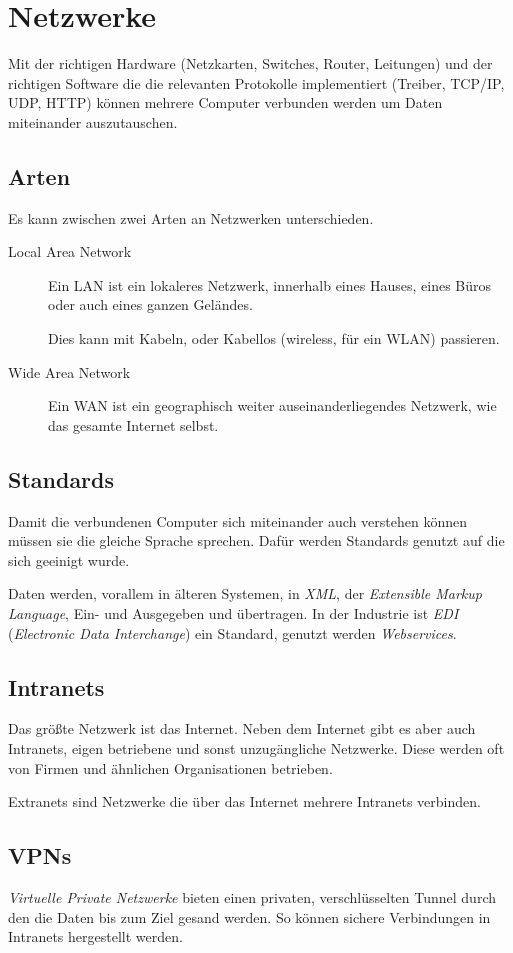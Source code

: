 \documentclass{article}
\begin{document}
\section{Netzwerke}
Mit der richtigen Hardware (Netzkarten, Switches, Router, Leitungen) und der richtigen Software die die relevanten Protokolle implementiert (Treiber, TCP/IP, UDP, HTTP) können mehrere Computer verbunden werden um Daten miteinander auszutauschen.

\subsection{Arten}
Es kann zwischen zwei Arten an Netzwerken unterschieden.
\begin{description}
 \item[Local Area Network] Ein LAN ist ein lokaleres Netzwerk, innerhalb eines Hauses, eines Büros oder auch eines ganzen Geländes.

Dies kann mit Kabeln, oder Kabellos (wireless, für ein WLAN) passieren.
 \item[Wide Area Network] Ein WAN ist ein geographisch weiter auseinanderliegendes Netzwerk, wie das gesamte Internet selbst.
\end{description}

\subsection{Standards}
Damit die verbundenen Computer sich miteinander auch verstehen können müssen sie die gleiche Sprache sprechen. Dafür werden Standards genutzt auf die sich geeinigt wurde.

Daten werden, vorallem in älteren Systemen, in \emph{XML}, der \emph{Extensible Markup Language}, Ein- und Ausgegeben und übertragen. In der Industrie ist \emph{EDI} (\emph{Electronic Data Interchange}) ein Standard, genutzt werden \emph{Webservices}.

\subsection{Intranets}
Das größte Netzwerk ist das Internet. Neben dem Internet gibt es aber auch Intranets, eigen betriebene und sonst unzugängliche Netzwerke. Diese werden oft von Firmen und ähnlichen Organisationen betrieben.

Extranets sind Netzwerke die über das Internet mehrere Intranets verbinden.

\subsection{VPNs}
\emph{Virtuelle Private Netzwerke} bieten einen privaten, verschlüsselten Tunnel durch den die Daten bis zum Ziel gesand werden. So können sichere Verbindungen in Intranets hergestellt werden.
\end{document}

